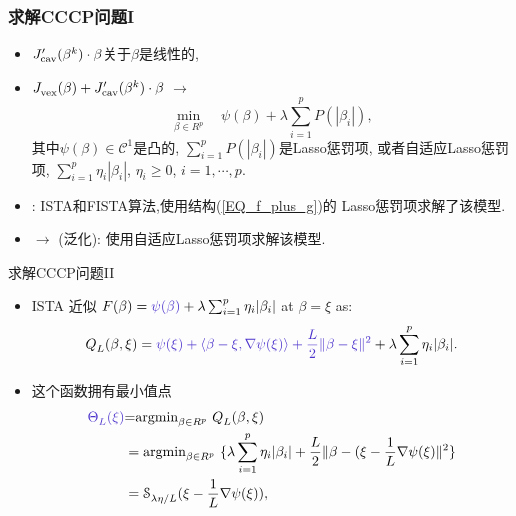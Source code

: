 \documentclass{beamer}
\begin{document}
\begin{frame}[allowframebreaks]
  \frametitle{求解CCCP问题I}



\begin{itemize}
  \item
 $J_{\textnormal{cav}}^{\prime}(\beta^k)\cdot \beta$关于$\beta$是线性的,

\item $J_{\textnormal{vex}}^{}(\beta) + J_{\textnormal{cav}}^{\prime}(\beta^k)\cdot \beta$ $\rightarrow$
\begin{equation}\label{EQ_f_plus_g}
  \min_{\beta\in R^p}\quad   \psi(\beta) + \lambda \sum_{i=1}^{p} P(|\beta_i|),
\end{equation}
其中$\psi(\beta)\in \mathcal{C}^1$是凸的,
 $  \sum_{i=1}^{p} P(|\beta_i|) $是Lasso惩罚项, %
或者自适应Lasso惩罚项, $  \sum_{i=1}^{p} \eta_i |\beta_i| $, $\eta_i \geq 0$, $i=1,\cdots,p$.


\item
\cite{beck2009}: ISTA和FISTA算法,使用结构(\ref{EQ_f_plus_g})的 Lasso惩罚项求解了该模型.

\item  $\rightarrow$ (泛化): 使用自适应Lasso惩罚项求解该模型.
\end{itemize}
\end{frame}

\begin{frame}{求解CCCP问题II}
    

\begin{itemize}
  \item  ISTA 近似 $F(\beta)=\hint{\psi(\beta)} + \lambda\sum_{i=1}^{p} \eta_i |\beta_i|$ at $\beta = \xi$ as:
\begin{equation*}
  Q_{L}^{}(\beta,\xi) = \hint{\psi(\xi) + \langle \beta-\xi,\nabla \psi(\xi) \rangle  + \frac{L}{2}\|\beta-\xi\|_{}^{2} }
   +    \lambda\sum_{i=1}^{p} \eta_i |\beta_i|.
\end{equation*}

\item 这个函数拥有最小值点
\begin{equation}\label{EQ_P_L}
  \begin{aligned}
   \hint{ \Theta_{L}^{}(\xi)} & {=} \textnormal{argmin}_{\beta\in R^p}^{} \ Q_{L}^{}(\beta,\xi) \\
        & = \textnormal{argmin}_{\beta \in R^p}^{}\ \{   \lambda\sum_{i=1}^{p} \eta_i |\beta_i| + \frac{L}{2}\|\beta-(\xi-\frac{1}{L} \nabla \psi(\xi)\|_{}^{2} \} \\
        &  =  \mathcal{S}_{\lambda\eta/L}^{} (\xi - \frac{1}{L} \nabla \psi(\xi)),
  \end{aligned}
\end{equation}
\end{itemize}
\end{frame}
\end{document}
